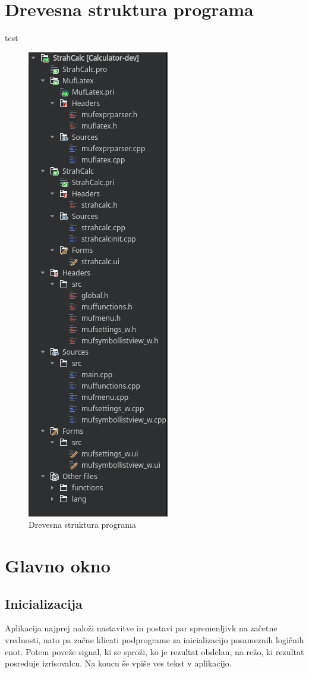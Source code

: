 \documentclass[12pt,titlepage]{report}
\begin{document}
	\section{Drevesna struktura programa}
	\label{project_tree}
		test
		\begin{figure}
			\centering
			\includegraphics{project_tree.png}
			\caption{Drevesna struktura programa}
			\label{fig:project_tree}
		\end{figure}
	\section{Glavno okno}
	\label{mainwindow_impl}
		\subsection{Inicializacija}
		\label{constructor}
			Aplikacija najprej naloži nastavitve in postavi par spremenljivk na začetne vrednosti, nato pa začne klicati podprograme za inicializacijo posameznih logičnih enot. %
			Potem poveže signal, ki se sproži, ko je rezultat obdelan, na režo, ki rezultat posreduje izrisovalcu.
			Na koncu še vpiše ves tekst v aplikacijo.
			
\end{document}

